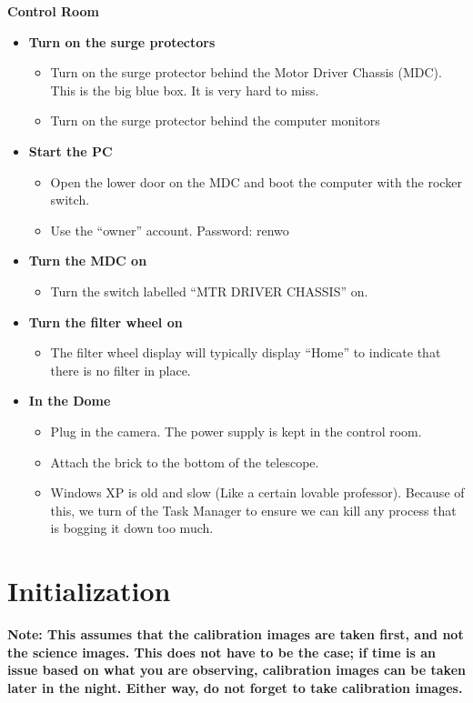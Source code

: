 \documentclass[letterpaper, 12pt]{report}
\begin{document}
{\large\textbf{Control Room}}
\begin{itemize}
	\item \textbf{Turn on the surge protectors}
	\begin{itemize}
		\item Turn on the surge protector behind the Motor Driver Chassis (MDC). This is the big blue box. It is very hard to miss.
		\item Turn on the surge protector behind the computer monitors
	\end{itemize}
	\item \textbf{Start the PC}
	\begin{itemize}
		\item Open the lower door on the MDC and boot the computer with the rocker switch.
		\item Use the ``owner'' account. Password: renwo
	\end{itemize}
	\item \textbf{Turn the MDC on}
	\begin{itemize}
		\item Turn the switch labelled ``MTR DRIVER CHASSIS'' on.
	\end{itemize}
	\item \textbf{Turn the filter wheel on}
	\begin{itemize}
		\item The filter wheel display will typically display ``Home'' to indicate that there is no filter in place.
	\end{itemize}
	\item \textbf{In the Dome}
	\begin{itemize}
		\item Plug in the camera. The power supply is kept in the control room.
		\item Attach the brick to the bottom of the telescope.
	\end{itemize}
	\begin{itemize}
		\item Windows XP is old and slow (Like a certain lovable professor). Because of this, we turn of the Task Manager to ensure we can kill any process that is bogging it down too much.
	\end{itemize}
\end{itemize}

\newpage



\chapter{Initialization}\label{ch:3}
\textbf{Note: This assumes that the calibration images are taken first, and not the science images. This does not have to be the case; if time is an issue based on what you are observing, calibration images can be taken later in the night. Either way, do not forget to take calibration images.} \\
\end{document}
